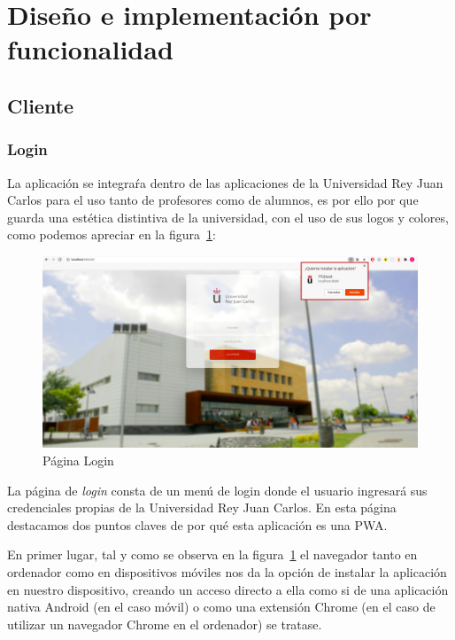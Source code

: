 \documentclass[a4paper, 12pt]{book}
\begin{document}
\section{Diseño e implementación por funcionalidad } 

\subsection{Cliente}

\subsubsection{Login}
	La aplicación se integraŕa dentro de las aplicaciones de la Universidad Rey Juan Carlos para el uso tanto de profesores como de alumnos, es por ello por que guarda una estética distintiva de la universidad, con el uso de sus logos y colores, como podemos apreciar en la figura~\ref{fig:principalHome}:
	
	\begin{figure}[h!]
  	\centering
  	\includegraphics[width=16cm, keepaspectratio]{img/principalHome.png}
  	\caption{Página Login}\label{fig:principalHome}
	\end{figure}
	
La página de \textit{login} consta de un menú de login donde el usuario ingresará sus credenciales propias de la Universidad Rey Juan Carlos. En esta página destacamos dos puntos claves de por qué esta aplicación es una PWA.
	
	En primer lugar, tal y como se observa en la figura~\ref{fig:principalHome} el navegador tanto en ordenador como en dispositivos móviles nos da la opción de instalar la aplicación en nuestro dispositivo, creando un acceso directo a ella como si de una aplicación nativa Android (en el caso móvil) o como una extensión Chrome (en el caso de utilizar un navegador Chrome en el ordenador) se tratase.
\end{document}
